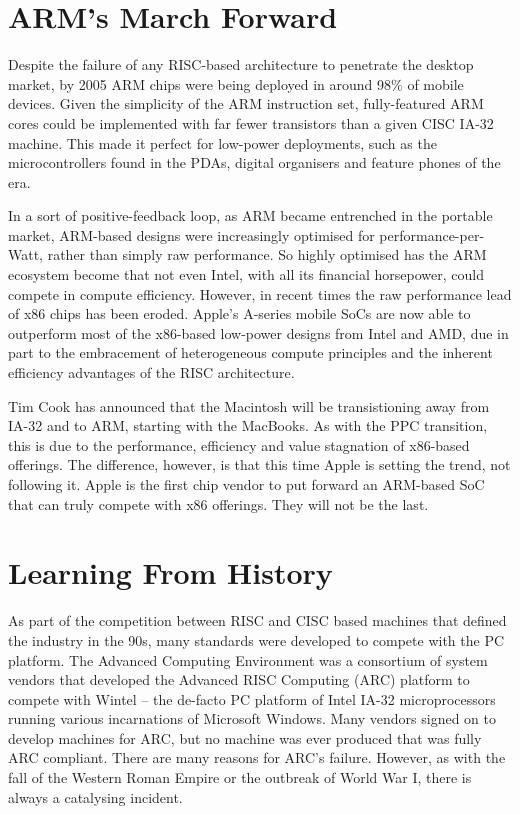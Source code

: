 \documentclass[12pt]{report}
\begin{document}
\section{ARM's March Forward}
Despite the failure of any RISC-based architecture to penetrate the desktop market, by 2005 ARM chips were being deployed
in around 98\% of mobile devices. Given the simplicity of the ARM instruction set, fully-featured ARM cores could be
implemented with far fewer transistors than a given CISC IA-32 machine. This made it perfect for low-power deployments,
such as the microcontrollers found in the PDAs, digital organisers and feature phones of the era.

In a sort of positive-feedback loop, as ARM became entrenched in the portable market, ARM-based designs were increasingly
optimised for performance-per-Watt, rather than simply raw performance. So highly optimised has the ARM ecosystem become
that not even Intel, with all its financial horsepower, could compete in compute efficiency. However, in recent times the
raw performance lead of x86 chips has been eroded. Apple's A-series mobile SoCs are now able to outperform most of the
x86-based low-power designs from Intel and AMD, due in part to the embracement of heterogeneous compute principles and
the inherent efficiency advantages of the RISC architecture.

Tim Cook has announced that the Macintosh will be transistioning away from IA-32 and to ARM, starting with the MacBooks.
As with the PPC transition, this is due to the performance, efficiency and value stagnation of x86-based offerings. The difference,
however, is that this time Apple is setting the trend, not following it. Apple is the first chip vendor to put forward
an ARM-based SoC that can truly compete with x86 offerings. They will not be the last.

\section{Learning From History}
As part of the competition between RISC and CISC based machines that defined the industry in the 90s, many standards were
developed to compete with the PC platform. The Advanced Computing Environment was a consortium of system vendors that developed
the Advanced RISC Computing (ARC) platform to compete with Wintel -- the de-facto PC platform of Intel IA-32 microprocessors
running various incarnations of Microsoft Windows. Many vendors signed on to develop machines for ARC, but no machine was
ever produced that was fully ARC compliant. There are many reasons for ARC's failure. However, as with the fall of the
Western Roman Empire or the outbreak of World War I, there is always a catalysing incident.
\end{document}
